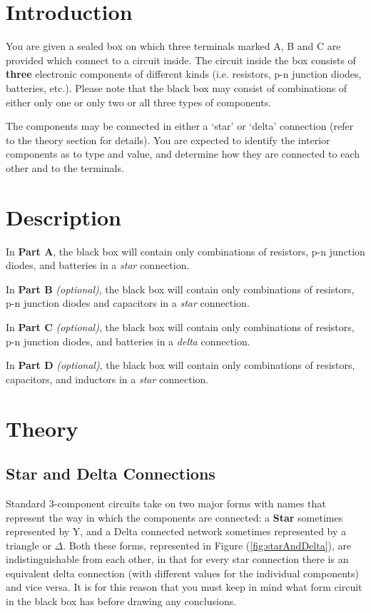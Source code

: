 \section*{Introduction}

You are given a sealed box on which three terminals marked A, B and C are provided which connect to a circuit inside. The circuit inside the box consists of \textbf{three} electronic components of different kinds (i.e. resistors, p-n junction diodes, batteries, etc.). Please note that the black box may consist of combinations of either only one or only two or all three types of components. 

The components may be connected in either a `star' or `delta' connection (refer to the theory section for details). You are expected to identify the interior components as to type and value, and determine how they are connected to each other and to the terminals. 


\section*{Description}

In \textbf{Part A}, the black box will contain only combinations of resistors, p-n junction diodes, and batteries in a \textit{star} connection.

In \textbf{Part B} \textit{(optional)}, the black box will contain only combinations of resistors, p-n junction diodes and capacitors in a \textit{star} connection. 

In \textbf{Part C} \textit{(optional)}, the black box will contain only combinations of resistors, p-n junction diodes, and batteries in a \textit{delta} connection. 

In \textbf{Part D} \textit{(optional)}, the black box will contain only combinations of  resistors, capacitors, and inductors in a \textit{star} connection.


\section*{Theory}

\subsection*{Star and Delta Connections}

Standard 3-component circuits take on two major forms with names that represent the way in which the components are connected: a \textbf{Star} sometimes represented by Y, and a Delta connected network sometimes represented by a triangle or $\Delta$. Both these forms, represented in Figure (\ref{fig:starAndDelta}), are indistinguishable from each other, in that for every star connection there is an equivalent delta connection (with different values for the individual components) and vice versa. It is for this reason that you must keep in mind what form circuit in the black box has before drawing any conclusions.

